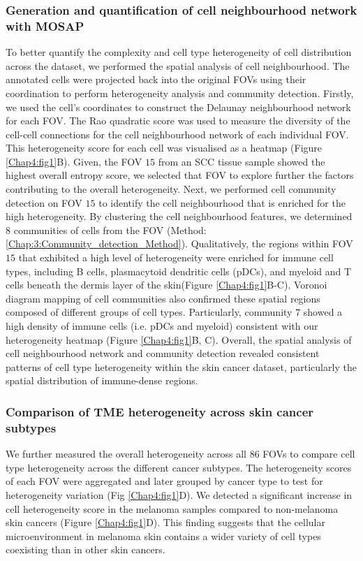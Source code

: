 \subsubsection{Generation and quantification of cell neighbourhood network with MOSAP}
To better quantify the complexity and cell type heterogeneity of cell distribution across the dataset, we performed the spatial analysis of cell neighbourhood. The annotated cells were projected back into the original FOVs using their coordination to perform heterogeneity analysis and community detection. Firstly, we used the cell's coordinates to construct the Delaunay neighbourhood network for each FOV. The Rao quadratic score was used to measure the diversity of the cell-cell connections for the cell neighbourhood network of each individual FOV.  This heterogeneity score for each cell was visualised as a heatmap (Figure \ref{Chap4:fig1}B). Given, the FOV $15$ from an SCC tissue sample showed the highest overall entropy score, we selected that FOV to explore further the factors contributing to the overall heterogeneity. Next, we performed cell community detection on FOV $15$ to identify the cell neighbourhood that is enriched for the high heterogeneity. By clustering the cell neighbourhood features, we determined $8$ communities of cells from the FOV (Method: \ref{Chap:3:Community_detection_Method}). Qualitatively, the regions within FOV $15$ that exhibited a high level of heterogeneity were enriched for immune cell types, including B cells, plasmacytoid dendritic cells (pDCs), and myeloid and T cells beneath the dermis layer of the skin(Figure \ref{Chap4:fig1}B-C). Voronoi diagram mapping of cell communities also confirmed these spatial regions composed of different groups of cell types. Particularly, community $7$ showed a high density of immune cells (i.e. pDCs and myeloid) consistent with our heterogeneity heatmap (Figure \ref{Chap4:fig1}B, C). Overall, the spatial analysis of cell neighbourhood network and community detection revealed consistent patterns of cell type heterogeneity within the skin cancer dataset, particularly the spatial distribution of immune-dense regions.
\subsubsection{Comparison of TME heterogeneity across skin cancer subtypes}
We further measured the overall heterogeneity across all $86$ FOVs to compare cell type heterogeneity across the different cancer subtypes. The heterogeneity scores of each FOV were aggregated and later grouped by cancer type to test for heterogeneity variation (Fig \ref{Chap4:fig1}D). We detected a significant increase in cell heterogeneity score in the melanoma samples compared to non-melanoma skin cancers (Figure \ref{Chap4:fig1}D). This finding suggests that the cellular microenvironment in melanoma skin contains a wider variety of cell types coexisting than in other skin cancers. 


